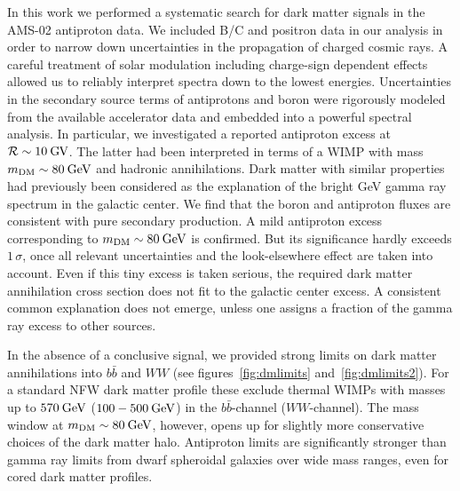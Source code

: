 \documentclass[a4paper,11pt]{article}
\newcommand{\eVdist}{\kern-0.06em}
\newcommand{\gev}{\:\text{Ge\eVdist V}}
\newcommand{\gv}{\:\text{G\eVdist V}}
\newcommand{\R}{\mathcal{R}}
\begin{document}
In this work we performed a systematic search for dark matter signals in the AMS-02 antiproton data. We included B/C and positron data in our analysis in order to narrow down uncertainties in the propagation of charged cosmic rays. A careful treatment of solar modulation including charge-sign dependent effects allowed us to reliably interpret spectra down to the lowest energies. Uncertainties in the secondary source terms of antiprotons and boron were rigorously modeled from the available accelerator data and embedded into a powerful spectral analysis. In particular, we investigated a reported antiproton excess at $\R\sim 10\gv$. The latter had been interpreted in terms of a WIMP with mass $m_{\text{DM}}\sim 80\gev$ and hadronic annihilations. Dark matter with similar properties had previously been considered as the explanation of the bright GeV gamma ray spectrum in the galactic center. We find that the boron and antiproton fluxes are consistent with pure secondary production. A mild antiproton excess corresponding to $m_{\text{DM}}\sim 80\gev$ is confirmed. But its significance hardly exceeds $1\,\sigma$, once all relevant uncertainties and the look-elsewhere effect are taken into account. Even if this tiny excess is taken serious, the required dark matter annihilation cross section does not fit to the galactic center excess. A consistent common explanation does not emerge, unless one assigns a fraction of the gamma ray excess to other sources. 

In the absence of a conclusive signal, we provided strong limits on dark matter annihilations into $b\bar{b}$ and $WW$ (see figures~\ref{fig:dmlimits} and~\ref{fig:dmlimits2}). For a standard NFW dark matter profile these exclude thermal WIMPs with masses up to $570\gev$ ($100-500\gev$) in the $b\bar{b}$-channel ($WW$-channel). The mass window at $m_{\text{DM}}\sim 80\gev$, however, opens up for slightly more conservative choices of the dark matter halo. Antiproton limits are significantly stronger than gamma ray limits from dwarf spheroidal galaxies over wide mass ranges, even for cored dark matter profiles.
\end{document}
